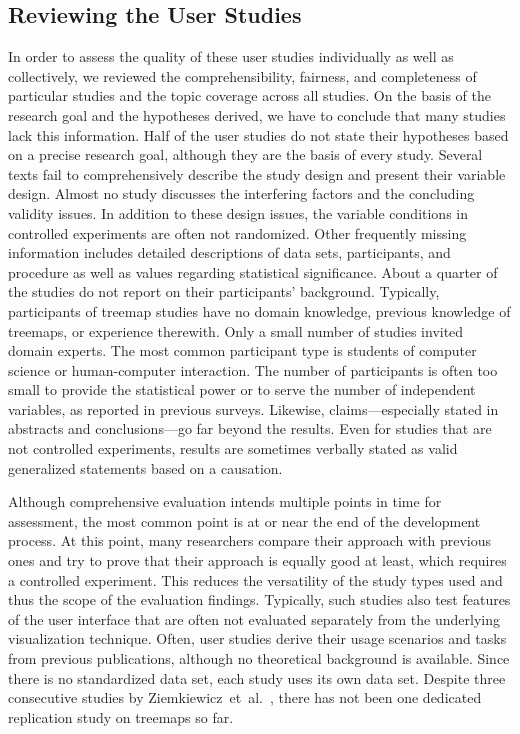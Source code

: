 \documentclass[sigconf,
natbib=true]{acmart}
\begin{document}
\subsection{Reviewing the User Studies}
In order to assess the quality of these user studies individually as well as collectively, we reviewed the comprehensibility, fairness, and completeness of particular studies and the topic coverage across all studies.
On the basis of the research goal and the hypotheses derived, we have to conclude that many studies lack this information.
Half of the user studies do not state their hypotheses based on a precise research goal, although they are the basis of every study. 
Several texts fail to comprehensively describe the study design and present their variable design.
Almost no study discusses the interfering factors and the concluding validity issues. 
In addition to these design issues, the variable conditions in controlled experiments are often not randomized.
Other frequently missing information includes detailed descriptions of data sets, participants, and procedure as well as values regarding statistical significance.
About a quarter of the studies do not report on their participants' background.
Typically, participants of treemap studies have no domain knowledge, previous knowledge of treemaps, or experience therewith.
Only a small number of studies invited domain experts.
The most common participant type is students of computer science or human-computer interaction.
The number of participants is often too small to provide the statistical power or to serve the number of independent variables, as reported in previous surveys.
Likewise, claims---especially stated in abstracts and conclusions---go far beyond the results.
Even for studies that are not controlled experiments, results are sometimes verbally stated as valid generalized statements based on a causation. 
\par
Although comprehensive evaluation intends multiple points in time for assessment, the most common point is at or near the end of the development process.
At this point, many researchers compare their approach with previous ones and try to prove that their approach is equally good at least, which requires a controlled experiment.
This reduces the versatility of the study types used and thus the scope of the evaluation findings.
Typically, such studies also test features of the user interface that are often not evaluated separately from the underlying visualization technique.
Often, user studies derive their usage scenarios and tasks from previous publications, although no theoretical background is available.
Since there is no standardized data set, each study uses its own data set.
Despite three consecutive studies by Ziemkiewicz~et~al.~\cite{ziemkiewicz2008-metaphors,ziemkiewicz2009-preconceptions,ziemkiewicz2011-locus}, there has not been one dedicated replication study on treemaps so far.
\end{document}
